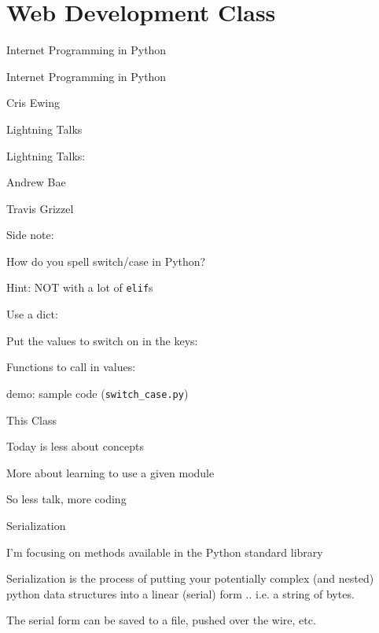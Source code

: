 \documentclass{beamer}
\begin{document}
\section{Web Development Class}

\begin{frame}[fragile]{Internet Programming in Python}

\vfill
{\LARGE Internet Programming in Python }

\vfill
{\LARGE Cris Ewing}

\end{frame}

\begin{frame}{Lightning Talks}

{\LARGE Lightning Talks:}

\vfill
{\Large Andrew Bae }

\vfill
{\Large Travis  Grizzel }

\vfill

\end{frame}

\begin{frame}[fragile]{Side note:}

{\Large How do you spell switch/case in Python?}

\vfill
{\hspace{0.2in} Hint: NOT with a lot of \verb`elif`s}

\vfill
{\Large Use a dict:}

\vfill
{\Large Put the values to switch on in the keys:}

\vfill
{\Large Functions to call in values:}

\vfill
demo: sample code (\verb|switch_case.py|)
\end{frame} 



\begin{frame}{This Class}

\vfill
{\Large Today is less about concepts}

\vfill
{\Large More about learning to use a given module}

\vfill
{\Large So less talk, more coding}

\end{frame}


\begin{frame}[fragile]{Serialization}

\vfill
{\Large I'm focusing on methods available in the Python standard library}

\vfill
{\Large Serialization is the process of putting your potentially complex
(and nested) python data structures into a linear (serial) form .. i.e. a string of bytes.}

\vfill
{\Large The serial form can be saved to a file, pushed over the wire, etc.}

\end{frame} 
\end{document}
